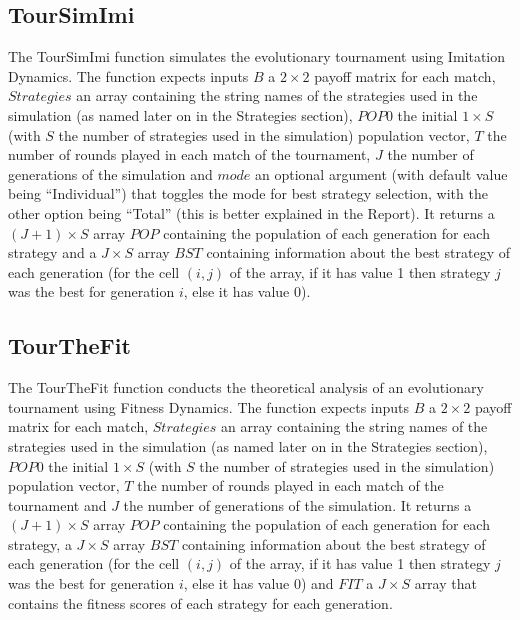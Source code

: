 \subsection{TourSimImi}
The TourSimImi function simulates the evolutionary tournament using Imitation Dynamics. The function expects inputs $B$ a $2 \times 2$ payoff matrix for each match, $Strategies$ an array containing the string names of the strategies used in the simulation (as named later on in the Strategies section), $POP0$ the initial $1 \times S$ (with $S$ the number of strategies used in the simulation) population vector, $T$ the number of rounds played in each match of the tournament, $J$ the number of generations of the simulation and $mode$ an optional argument (with default value being ``Individual'') that toggles the mode for best strategy selection, with the other option being ``Total'' (this is better explained in the Report). It returns a $(J+1) \times S$ array $POP$ containing the population of each generation for each strategy and a $J \times S$ array $BST$ containing information about the best strategy of each generation (for the cell $(i,j)$ of the array, if it has value 1 then strategy $j$ was the best for generation $i$, else it has value 0).

\subsection{TourTheFit}
The TourTheFit function conducts the theoretical analysis of an evolutionary tournament using Fitness Dynamics. The function expects inputs $B$ a $2 \times 2$ payoff matrix for each match, $Strategies$ an array containing the string names of the strategies used in the simulation (as named later on in the Strategies section), $POP0$ the initial $1 \times S$ (with $S$ the number of strategies used in the simulation) population vector, $T$ the number of rounds played in each match of the tournament and $J$ the number of generations of the simulation. It returns a $(J+1) \times S$ array $POP$ containing the population of each generation for each strategy, a $J \times S$ array $BST$ containing information about the best strategy of each generation (for the cell $(i,j)$ of the array, if it has value 1 then strategy $j$ was the best for generation $i$, else it has value 0) and $FIT$ a $J \times S$ array that contains the fitness scores of each strategy for each generation.


